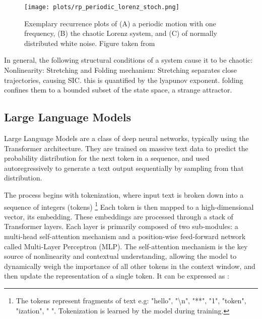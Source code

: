 \documentclass[a4paper,12pt]{article}
\begin{document}
\begin{figure}[H]
    \centering
    \texttt{[image: plots/rp\_periodic\_lorenz\_stoch.png]}
    \caption{Exemplary recurrence plots of (A) a periodic motion with one frequency, (B) the chaotic Lorenz system, and (C) of normally distributed white noise. Figure taken from \cite{DONNER_2011}}
    \label{fig:rp_examples}
\end{figure}


In general, the following structural conditions of a system cause it to be chaotic:
Nonlinearity: %
Stretching and Folding mechanism: Stretching separates close trajectories, causing SIC. this is quantified by the lyapunov exponent. folding confines them to a bounded subset of the state space, a strange attractor.
\cite{Hnon1976ATM}
\cite{ROSSLER1976}
\cite{strogatz_textbook}


\subsection{Large Language Models}
\label{subsec:llms}
Large Language Models are a class of deep neural networks, typically using the Transformer architecture. They are trained on massive text data to predict the probability distribution for the next token in a sequence, and used autoregressively to generate a text output sequentially by sampling from that distribution.

The process begins with tokenization, where input text is broken down into a sequence of integers (tokens) \footnote{The tokens represent fragments of text e.g: "hello", "\textbackslash n", "**", "1", "token", "ization", " ". Tokenization is learned by the model during training.} Each token is then mapped to a high-dimensional vector, its embedding. These embeddings are processed through a stack of Transformer layers. Each layer is primarily composed of two sub-modules: a multi-head self-attention mechanism and a position-wise feed-forward network called Multi-Layer Perceptron (MLP). The self-attention mechanism is the key source of nonlinearity and contextual understanding, allowing the model to dynamically weigh the importance of all other tokens in the context window, and then update the representation of a single token. It can be expressed as \cite{attention}:
\end{document}
